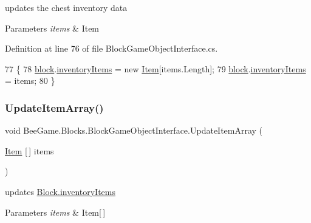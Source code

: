 updates the chest inventory data 


\begin{DoxyParams}{Parameters}
{\em items} & Item\\
\hline
\end{DoxyParams}


Definition at line 76 of file Block\+Game\+Object\+Interface.\+cs.


\begin{DoxyCode}
77         \{
78             \hyperlink{class_bee_game_1_1_blocks_1_1_block_game_object_interface_a238bad3b956ec84c8b1cc3127948b75d}{block}.\hyperlink{class_bee_game_1_1_blocks_1_1_block_a54846c7c7ec2f512484b3060de977fac}{inventoryItems} = \textcolor{keyword}{new} \hyperlink{struct_bee_game_1_1_items_1_1_item}{Item}[items.Length];
79             \hyperlink{class_bee_game_1_1_blocks_1_1_block_game_object_interface_a238bad3b956ec84c8b1cc3127948b75d}{block}.\hyperlink{class_bee_game_1_1_blocks_1_1_block_a54846c7c7ec2f512484b3060de977fac}{inventoryItems} = items;
80         \}
\end{DoxyCode}
\mbox{\label{class_bee_game_1_1_blocks_1_1_block_game_object_interface_acecdd76ab9fd7639409fe29ebd29d4fd}} 
\subsubsection{\texorpdfstring{Update\+Item\+Array()}{UpdateItemArray()}}
{\footnotesize\ttfamily void Bee\+Game.\+Blocks.\+Block\+Game\+Object\+Interface.\+Update\+Item\+Array (\begin{DoxyParamCaption}\item[{\hyperlink{struct_bee_game_1_1_items_1_1_item}{Item} \mbox{[}$\,$\mbox{]}}]{items }\end{DoxyParamCaption})}



updates \hyperlink{class_bee_game_1_1_blocks_1_1_block_a54846c7c7ec2f512484b3060de977fac}{Block.\+inventory\+Items} 


\begin{DoxyParams}{Parameters}
{\em items} & Item\mbox{[}$\,$\mbox{]}\\
\hline
\end{DoxyParams}


